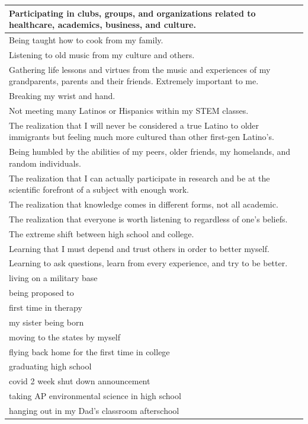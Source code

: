 \documentclass[
  .7em,
  letterpaper,
  DIV=11,
  numbers=noendperiod]{scrartcl}
\begin{document}
\begin{table}
\begin{tabular}{l}
\hline
Participating in clubs, groups, and organizations related to healthcare, academics, business, and culture.\\
\hline
Being taught how to cook from my family.\\
\hline
Listening to old music from my culture and others.\\
\hline
Gathering life lessons and virtues from the music and experiences of my grandparents, parents and their friends. Extremely important to me.\\
\hline
Breaking my wrist and hand.\\
\hline
Not meeting many Latinos or Hispanics within my STEM classes.\\
\hline
The realization that I will never be considered a true Latino to older immigrants but feeling much more cultured than other first-gen Latino's.\\
\hline
Being humbled by the abilities of my peers, older friends, my homelands, and random individuals.\\
\hline
The realization that I can actually participate in research and be at the scientific forefront of a subject with enough work.\\
\hline
The realization that knowledge comes in different forms, not all academic.\\
\hline
The realization that everyone is worth listening to regardless of one's beliefs.\\
\hline
The extreme shift between high school and college.\\
\hline
Learning that I must depend and trust others in order to better myself.\\
\hline
Learning to ask questions, learn from every experience, and try to be better.\\
\hline
living on a military base\\
\hline
being proposed to\\
\hline
first time in therapy\\
\hline
my sister being born\\
\hline
moving to the states by myself\\
\hline
flying back home for the first time in college\\
\hline
graduating high school\\
\hline
covid 2 week shut down announcement\\
\hline
taking AP environmental science in high school\\
\hline
hanging out in my Dad’s classroom afterschool\\

\end{tabular}
\end{table}
\end{document}
